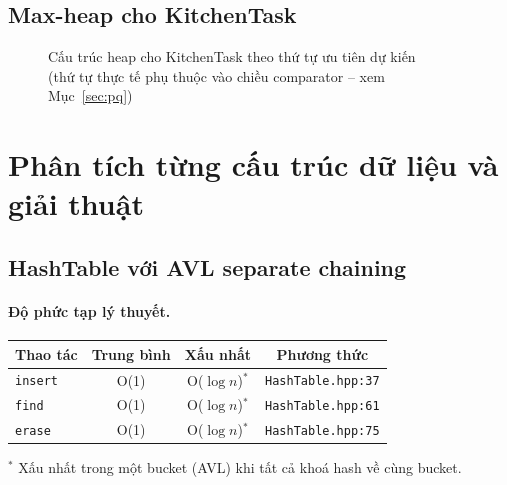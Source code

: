 \documentclass[12pt, a4paper]{article}
\begin{document}
\subsection{Max-heap cho KitchenTask}

\begin{figure}[H]
\centering
{}
\caption{Cấu trúc heap cho KitchenTask theo thứ tự ưu tiên dự kiến \\
  \small (thứ tự thực tế phụ thuộc vào chiều comparator -- xem Mục~\ref{sec:pq})}
\end{figure}

\section{Phân tích từng cấu trúc dữ liệu và giải thuật}
\label{sec:analysis}

\subsection{HashTable với AVL separate chaining}

\paragraph{Độ phức tạp lý thuyết.}
\begin{table}[H]
\centering
\begin{tabular}{lccc}
\toprule
\textbf{Thao tác} & \textbf{Trung bình} & \textbf{Xấu nhất} & \textbf{Phương thức} \\
\midrule
\texttt{insert} & O(1) & O($\log n$)$^*$ & \texttt{HashTable.hpp:37} \\
\texttt{find}   & O(1) & O($\log n$)$^*$ & \texttt{HashTable.hpp:61} \\
\texttt{erase}  & O(1) & O($\log n$)$^*$ & \texttt{HashTable.hpp:75} \\
\bottomrule
\end{tabular}
\end{table}
{\footnotesize $^*$ Xấu nhất trong một bucket (AVL) khi tất cả khoá hash về cùng bucket.}
\end{document}
